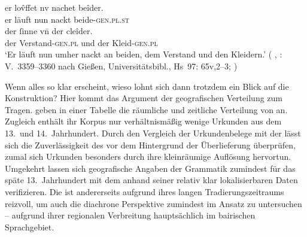 \begin{exe}
\ex \label{ex:gendatconj}
	\begin{xlist}
	\ex \label{ex:gendatconj_1}
		\gll er lov̂ffet nv nachet beîder. \\
			er läuft nun nackt beide-\textsc{gen.pl.st} \\
	\sn \gll der ſinne vn̄ der cleîder. \\
			der Verstand-\textsc{gen.pl} und der
				Kleid-\textsc{gen.pl} \\
		\trans `Er läuft nun umher nackt an beiden, dem
			Verstand und den Kleidern.'
			(%
				, : V.~3359--3360 nach
				Gießen, Universitätsbibl., Hs~97: 65v,2--3;
				\cite[vgl.][500]{mertens2004}%
			)

	\end{xlist}
\end{exe}
%

Wenn alles so klar erscheint, wieso lohnt sich dann trotzdem ein Blick auf die
Konstruktion? Hier kommt das Argument der geografischen
Verteilung zum Tragen. \citet[627]{ksw2} geben in
einer Tabelle die räumliche und
zeitliche Verteilung von  an. Zugleich
enthält ihr Korpus nur verhältnismäßig wenige Urkunden aus dem 13.\ und 14.\
Jahrhundert. Durch den Vergleich der Urkundenbelege mit der
 lässt sich die
Zuverlässigkeit des \CAO{} vor dem Hintergrund der Überlieferung überprüfen,
zumal sich Urkunden besonders durch ihre kleinräumige Auflösung hervortun.
Umgekehrt lassen sich geografische\is{Dialektgeografie} Angaben der Grammatik
zumindest für das späte 13.~Jahrhundert mit dem \CAO{} anhand seiner relativ
klar lokalisierbaren Daten verifizieren. Die \KC{} ist andererseits aufgrund
ihres langen Tradierungs\-zeitraums reizvoll, um auch die
diachrone Perspektive zumindest im Ansatz zu untersuchen --
aufgrund ihrer regionalen Verbreitung hauptsächlich im bairischen
Sprachgebiet.
